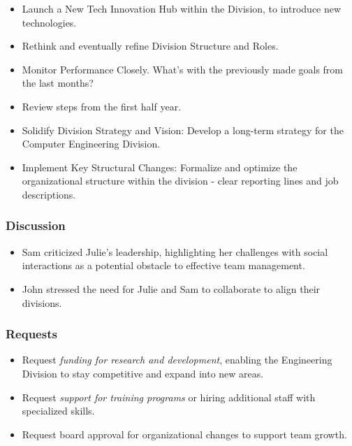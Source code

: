 \documentclass[a4paper,12pt]{article}
\begin{document}
\begin{itemize}
    \item Launch a New Tech Innovation Hub within the Division, to introduce new technologies.
    \item Rethink and eventually refine Division Structure and Roles.
    \item Monitor Performance Closely. What's with the previously made goals from the last months?
\end{itemize}

\begin{itemize}
    \item Review steps from the first half year.
    \item Solidify Division Strategy and Vision: Develop a long-term strategy for the Computer Engineering Division.
    \item Implement Key Structural Changes: Formalize and optimize the organizational structure within the division - clear reporting lines and job descriptions. 
\end{itemize}

\subsubsection{Discussion}

\begin{itemize}
    \item Sam criticized Julie's leadership, highlighting her challenges with social interactions as a potential obstacle to effective team management.
    \item John stressed the need for Julie and Sam to collaborate to align their divisions.
\end{itemize}

\subsubsection{Requests}

\begin{itemize}
    \item Request \textit{funding for research and development}, enabling the Engineering Division to stay competitive and expand into new areas. 
    \item Request \textit{support for training programs} or hiring additional staff with specialized skills.
    \item Request board approval for organizational changes to support team growth.
\end{itemize}
\end{document}
